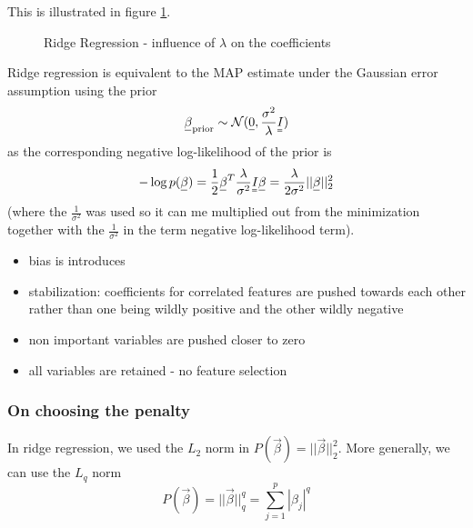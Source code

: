 This is illustrated in figure \ref{fig:ridge_reg_lambda}.

\begin{figure}[!htb]
    \centering
    
    \caption{Ridge Regression - influence of $\lambda$ on the coefficients}
    \label{fig:ridge_reg_lambda}
\end{figure}

Ridge regression is equivalent to the MAP estimate under the Gaussian error assumption using the prior
\begin{equation}
    \vec{\beta}_\text{prior} \sim \mathcal{N}(\vec{0}, \frac{\sigma^2}{\lambda} \mat{I})
\end{equation}
as the corresponding negative log-likelihood of the prior is
\begin{equation}
    -\log p(\vec{\beta}) = \frac{1}{2} \vec{\beta}^T \frac{\lambda}{\sigma^2} \mat{I} \vec{\beta} = \frac{\lambda}{2 \sigma^2} || \vec{\beta} ||_2^2
\end{equation}
(where the $\frac{1}{\sigma^2}$ was used so it can me multiplied out from the minimization
together with the $\frac{1}{\sigma^2}$ in the term negative log-likelihood term).

\begin{itemize}
    \item bias is introduces
    \item \textcolor{green1}{stabilization:} coefficients for correlated features are pushed towards each other rather than
    one being wildly positive and the other wildly negative
    \item \textcolor{green1}{non important variables are pushed closer to zero}
    \item \textcolor{red1}{all variables are retained - no feature selection}
\end{itemize}

\subsubsection{On choosing the penalty}
In ridge regression, we used the $L_2$ norm in $P(\vec{\beta}) = || \vec{\beta} ||_2^2$.
More generally, we can use the $L_q$ norm
\begin{equation}
    P(\vec{\beta}) = || \vec{\beta} ||_q^q = \sum_{j=1}^p |\beta_j|^q
\end{equation}


